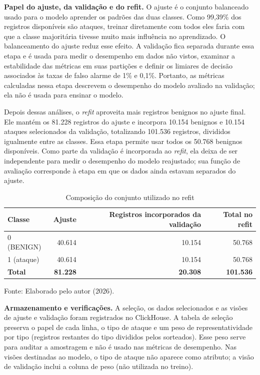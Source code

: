 \documentclass[
    12pt,                %
    openright,           %
    oneside,             %
    a4paper,             %
    english,             %
    brazil               %
]{abntex2}
\begin{document}
\textbf{Papel do ajuste, da validação e do refit.} O ajuste é o conjunto balanceado usado para o modelo aprender os padrões das duas classes. Como 99,39\% dos registros disponíveis são ataques, treinar diretamente com todos eles faria com que a classe majoritária tivesse muito mais influência no aprendizado. O balanceamento do ajuste reduz esse efeito. A validação fica separada durante essa etapa e é usada para medir o desempenho em dados não vistos, examinar a estabilidade das métricas em suas partições e definir os limiares de decisão associados às taxas de falso alarme de 1\% e 0,1\%. Portanto, as métricas calculadas nessa etapa descrevem o desempenho do modelo avaliado na validação; ela não é usada para ensinar o modelo.

Depois dessas análises, o \textit{refit} aproveita mais registros benignos no ajuste final. Ele mantém os 81.228 registros do ajuste e incorpora 10.154 benignos e 10.154 ataques selecionados da validação, totalizando 101.536 registros, divididos igualmente entre as classes. Essa etapa permite usar todos os 50.768 benignos disponíveis. Como parte da validação é incorporada ao \textit{refit}, ela deixa de ser independente para medir o desempenho do modelo reajustado; sua função de avaliação corresponde à etapa em que os dados ainda estavam separados do ajuste.

\begin{table}
\centering
\caption{Composição do conjunto utilizado no refit}
\label{tab:composicao-conjunto-refit}
\begin{tabular}{lrrr}
\hline
Classe & Ajuste & Registros incorporados da validação & Total no refit \\
\hline
0 (BENIGN) & 40.614 & 10.154 & 50.768 \\
1 (ataque) & 40.614 & 10.154 & 50.768 \\
\textbf{Total} & \textbf{81.228} & \textbf{20.308} & \textbf{101.536} \\
\hline
\end{tabular}
\par\smallskip
Fonte: Elaborado pelo autor (2026).
\end{table}

\textbf{Armazenamento e verificações.} A seleção, os dados selecionados e as visões de ajuste e validação foram registrados no ClickHouse. A tabela de seleção preserva o papel de cada linha, o tipo de ataque e um peso de representatividade por tipo (registros restantes do tipo divididos pelos sorteados). Esse peso serve para auditar a amostragem e não é usado nas métricas de desempenho. Nas visões destinadas ao modelo, o tipo de ataque não aparece como atributo; a visão de validação inclui a coluna de peso (não utilizada no treino).
\end{document}
